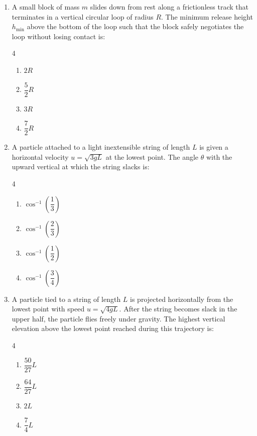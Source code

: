 \documentclass[11pt,a4paper]{article}
\begin{document}
\begin{enumerate}[label=\textbf{\arabic*.},leftmargin=18pt,itemsep=8pt,resume]
  \item A small block of mass $m$ slides down from rest along a frictionless track that terminates in a vertical circular loop of radius $R$. The minimum release height $h_{\min}$ above the bottom of the loop such that the block safely negotiates the loop without losing contact is:
  \begin{multicols}{4}
    \begin{enumerate}[label=(\Alph*)]
      \item $2R$
      \item $\dfrac{5}{2}R$
      \item $3R$
      \item $\dfrac{7}{2}R$
    \end{enumerate}
  \end{multicols}

  \item A particle attached to a light inextensible string of length $L$ is given a horizontal velocity $u = \sqrt{3gL}$ at the lowest point. The angle $\theta$ with the upward vertical at which the string slacks is:
  \begin{multicols}{4}
    \begin{enumerate}[label=(\Alph*)]
      \item $\cos^{-1}\left(\dfrac{1}{3}\right)$
      \item $\cos^{-1}\left(\dfrac{2}{3}\right)$
      \item $\cos^{-1}\left(\dfrac{1}{2}\right)$
      \item $\cos^{-1}\left(\dfrac{3}{4}\right)$
    \end{enumerate}
  \end{multicols}

  \item A particle tied to a string of length $L$ is projected horizontally from the lowest point with speed $u = \sqrt{4gL}$. After the string becomes slack in the upper half, the particle flies freely under gravity. The highest vertical elevation above the lowest point reached during this trajectory is:
  \begin{multicols}{4}
    \begin{enumerate}[label=(\Alph*)]
      \item $\dfrac{50}{27}L$
      \item $\dfrac{64}{27}L$
      \item $2L$
      \item $\dfrac{7}{4}L$
    \end{enumerate}
  \end{multicols}


\end{enumerate}
\end{document}
